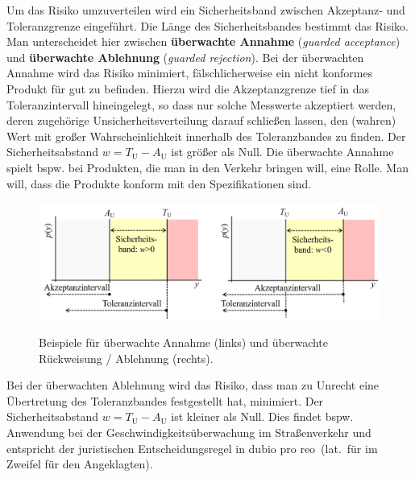 Um das Risiko umzuverteilen wird ein Sicherheitsband zwischen Akzeptanz- und Toleranzgrenze eingeführt. Die Länge des Sicherheitsbandes bestimmt das Risiko. Man unterscheidet hier zwischen \textbf{überwachte Annahme} (\textsl{guarded acceptance})
und \textbf{überwachte Ablehnung} (\textsl{guarded rejection}).
Bei der überwachten Annahme wird das Risiko minimiert, fälschlicherweise ein nicht konformes Produkt für gut zu befinden. Hierzu wird die Akzeptanzgrenze tief in das Toleranzintervall hineingelegt, so dass nur solche Messwerte akzeptiert werden, deren zugehörige Unsicherheitsverteilung darauf schließen lassen, den (wahren) Wert mit großer Wahrscheinlichkeit innerhalb des Toleranzbandes zu finden. Der Sicherheitsabstand $w= 	T_\mathrm{U} - A_\mathrm{U}$ ist größer als Null. Die überwachte Annahme spielt bspw. bei Produkten, die man in den Verkehr bringen will, eine Rolle. Man will, dass die Produkte konform mit den Spezifikationen sind.

\begin{figure}[!htp]
	\begin{center}
	\includegraphics[width=160mm]{05_vorlesung/media/AnnahmeRueckweisungMitToleranz.png}
		\caption{\label{fig:Verteilung_Risiko}} Beispiele für überwachte Annahme (links) und überwachte Rückweisung / Ablehnung (rechts).
	\end{center}
\end{figure}

Bei der überwachten Ablehnung wird das Risiko, dass man zu Unrecht eine Übertretung des Toleranzbandes festgestellt hat, minimiert.
Der Sicherheitsabstand $w= 	T_\mathrm{U} - A_\mathrm{U}$ ist kleiner als Null.
Dies findet bspw. Anwendung bei der Geschwindigkeitsüberwachung im Straßenverkehr und
entspricht der juristischen Entscheidungsregel \glqq in dubio pro reo\grqq ~(lat.\ für \glqq im Zweifel für
den Angeklagten\grqq).

